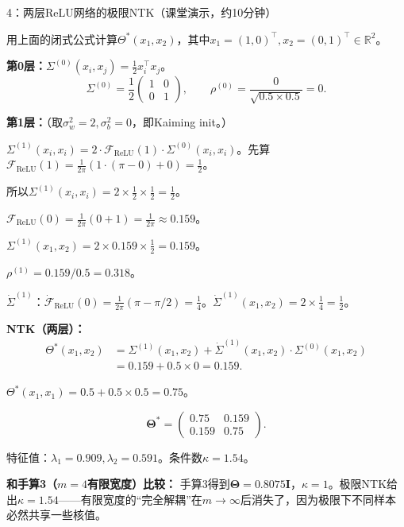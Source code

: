 \documentclass[11pt,a4paper]{article}
\newcommand{\R}{\mathbb{R}}
\newcommand{\bTheta}{\boldsymbol{\Theta}}
\newcommand{\bI}{\mathbf{I}}
\begin{document}
\begin{handcalc}{4：两层ReLU网络的极限NTK（课堂演示，约10分钟）}

用上面的闭式公式计算$\Theta^*(x_1,x_2)$，其中$x_1=(1,0)^\top, x_2=(0,1)^\top \in\R^2$。

\textbf{第0层：}$\Sigma^{(0)}(x_i,x_j) = \frac{1}{2}x_i^\top x_j$。
\[
\Sigma^{(0)} = \frac{1}{2}\begin{pmatrix}1&0\\0&1\end{pmatrix}, \qquad \rho^{(0)} = \frac{0}{\sqrt{0.5\times 0.5}} = 0.
\]

\textbf{第1层：}（取$\sigma_w^2=2, \sigma_b^2=0$，即Kaiming init。）

$\Sigma^{(1)}(x_i,x_i) = 2\cdot\mathcal{F}_{\text{ReLU}}(1)\cdot\Sigma^{(0)}(x_i,x_i)$。先算$\mathcal{F}_{\text{ReLU}}(1) = \frac{1}{2\pi}(1\cdot(\pi-0)+0)=\frac{1}{2}$。

所以$\Sigma^{(1)}(x_i,x_i) = 2\times\frac{1}{2}\times\frac{1}{2}=\frac{1}{2}$。

$\mathcal{F}_{\text{ReLU}}(0) = \frac{1}{2\pi}(0+1) = \frac{1}{2\pi}\approx 0.159$。

$\Sigma^{(1)}(x_1,x_2) = 2\times 0.159\times\frac{1}{2} = 0.159$。

$\rho^{(1)} = 0.159/0.5 = 0.318$。

$\dot\Sigma^{(1)}$：$\dot{\mathcal{F}}_{\text{ReLU}}(0)=\frac{1}{2\pi}(\pi-\pi/2)=\frac{1}{4}$。$\dot\Sigma^{(1)}(x_1,x_2) = 2\times\frac{1}{4} = \frac{1}{2}$。

\textbf{NTK（两层）：}
\begin{align}
\Theta^*(x_1,x_2) &= \Sigma^{(1)}(x_1,x_2) + \dot\Sigma^{(1)}(x_1,x_2)\cdot\Sigma^{(0)}(x_1,x_2) \\
&= 0.159 + 0.5\times 0 = 0.159.
\end{align}

$\Theta^*(x_1,x_1) = 0.5 + 0.5\times 0.5 = 0.75$。

\[
\bTheta^* = \begin{pmatrix}0.75 & 0.159 \\ 0.159 & 0.75\end{pmatrix}.
\]

特征值：$\lambda_1=0.909, \lambda_2=0.591$。条件数$\kappa=1.54$。

\textbf{和手算3（$m=4$有限宽度）比较：} 手算3得到$\bTheta=0.8075\bI$，$\kappa=1$。极限NTK给出$\kappa=1.54$——有限宽度的``完全解耦''在$m\to\infty$后消失了，因为极限下不同样本必然共享一些核值。
\end{handcalc}
\end{document}
